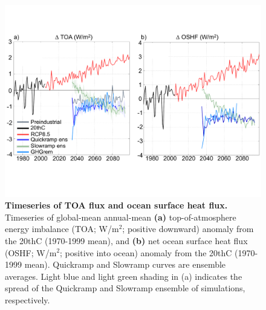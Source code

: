 \documentclass[grl]{AGUTeX}  %
\begin{document}
\begin{article}
\begin{figure}[htbp] %
\centering
 \noindent\includegraphics[width=39pc]{figures/EnergyFluxestimeseriesanom.pdf}
\caption{\textbf{Timeseries of TOA flux and ocean surface heat flux.} Timeseries of global-mean annual-mean \textbf{(a)} top-of-atmosphere energy imbalance (TOA; W/m$^2$; positive downward) anomaly from the 20thC (1970-1999 mean), and \textbf{(b)} net ocean surface heat flux (OSHF; W/m$^2$; positive into ocean) anomaly from the 20thC (1970-1999 mean). Quickramp and Slowramp curves are ensemble averages. Light blue and light green shading in (a) indicates the spread of the Quickramp and Slowramp ensemble of simulations, respectively.}
\label{fig:energyts}
\end{figure}


\end{article}
\end{document}
